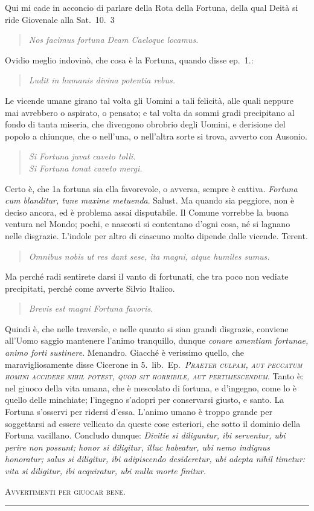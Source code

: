 \documentclass[11pt,a6paper]{article}
\newcommand{\literaryquote}[1]{%
\kern -6pt  \begin{verse}
    {\footnotesize \it #1}
  \end{verse}\kern -2pt%
}
\newcommand{\supersection}[1]{%
\clearpage
    {\scshape \centering \huge #1\\}
    \vspace{6pt}
    \hrule
    \vspace{12pt}
}
\begin{document}
{\footnotesize
Qui mi cade in acconcio di parlare della Rota
della Fortuna, della qual Deità si ride Giovenale
alla Sat.\ 10.\ 3

\literaryquote{Nos facimus fortuna Deam Caeloque locamus.}

Ovidio meglio indovinò, che cosa è la Fortuna,
quando disse ep.\ 1.:

\literaryquote{Ludit in humanis divina potentia rebus.}

Le vicende umane girano tal volta gli Uomini
a tali felicità, alle quali neppure mai avrebbero o
aspirato, o pensato; e tal volta da sommi gradi precipitano
al fondo di tanta miseria, che divengono
obrobrio degli Uomini, e derisione del popolo a
chiunque, che o nell'una, o nell'altra sorte si trova,
avverto con Ausonio.

\literaryquote{Si Fortuna juvat caveto tolli. \\
Si Fortuna tonat caveto mergi.}

Certo è, che 1a fortuna sia ella favorevole, o
avversa, sempre è cattiva. \textit{Fortuna cum blanditur,
 tune maxime metuenda}. Salust. Ma quando sia peggiore,
non è deciso ancora, ed è problema assai disputabile.
Il Comune vorrebbe la buona ventura
nel Mondo; pochi, e nascosti si contentano d'ogni
cosa, né si lagnano nelle disgrazie. L'indole per altro
di ciascuno molto dipende dalle vicende. Terent.

\literaryquote{Omnibus nobis ut res dant sese, ita magni, atque
humiles sumus.}

Ma perché radi sentirete darsi il vanto di fortunati,
che tra poco non vediate precipitati, perché come
avverte Silvio Italico.

\literaryquote{Brevis est magni Fortuna favoris.}

Quindi è, che nelle traversìe, e nelle quanto si sian
grandi disgrazie, conviene all'Uomo saggio mantenere
l'animo tranquillo, dunque \textit{conare amentiam
fortunae, animo forti sustinere}. Menandro. Giacché
è verissimo quello, che maravigliosamente disse
Cicerone in 5.\ lib.\ Ep.\ \textit{\textsc{Praeter culpam, aut peccatum
homini accidere nihil potest, quod sit
horribile, aut pertimescendum}}. Tanto è: nel
giuoco della vita umana, che è mescolato di
fortuna, e d'ingegno, come lo è quello delle minchiate;
l'ingegno s'adopri per conservarsi giusto, e santo.
La Fortuna s'osservi per ridersi d'essa. L'animo
umano è troppo grande per soggettarsi ad essere
vellicato da queste cose esteriori, che sotto il
dominio della Fortuna vacillano. Concludo dunque:
\textit{Divitie si diliguntur, ibi serventur, ubi perire non
possunt; honor si diligitur, illuc habeatur, ubi nemo
indignus honoratur; salus si diligitur, ibi adipiscendo
desideretur, ubi adepta nihil timetur: vita si
diligitur, ibi acquiratur, ubi nulla morte finitur.}
}
\supersection{Avvertimenti per giuocar bene.}
\end{document}
